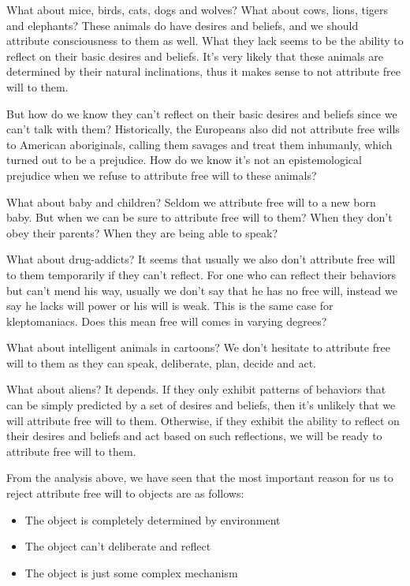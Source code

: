 What about mice, birds, cats, dogs and wolves? What about cows, lions, tigers and elephants? These animals do have desires and beliefs, and we should attribute consciousness to them as well. What they lack seems to be the ability to reflect on their basic desires and beliefs. It’s very likely that these animals are determined by their natural inclinations, thus it makes sense to not attribute free will to them.

But how do we know they can’t reflect on their basic desires and beliefs since we can’t talk with them? Historically, the Europeans also did not attribute free wills to American aboriginals, calling them savages and treat them inhumanly, which turned out to be a prejudice. How do we know it’s not an epistemological prejudice when we refuse to attribute free will to these animals?

What about baby and children? Seldom we attribute free will to a new born baby. But when we can be sure to attribute free will to them? When they don’t obey their parents? When they are being able to speak?

What about drug-addicts? It seems that usually we also don’t attribute free will to them temporarily if they can’t reflect. For one who can reflect their behaviors but can’t mend his way, usually we don’t say that he has no free will, instead we say he lacks will power or his will is weak. This is the same case for kleptomaniacs. Does this mean free will comes in varying degrees?

What about intelligent animals in cartoons? We don’t hesitate to attribute free will to them as they can speak, deliberate, plan, decide and act.

What about aliens? It depends. If they only exhibit patterns of behaviors that can be simply predicted by a set of desires and beliefs, then it’s unlikely that we will attribute free will to them. Otherwise, if they exhibit the ability to reflect on their desires and beliefs and act based on such reflections, we will be ready to attribute free will to them.

From the analysis above, we have seen that the most important reason for us to reject attribute free will to objects are as follows:

\begin{itemize}
\item The object is completely determined by environment
\item The object can’t deliberate and reflect
\item The object is just some complex mechanism
\end{itemize}

